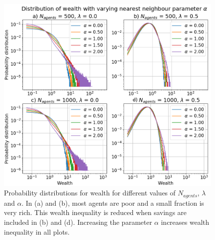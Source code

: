 \documentclass[11pt,a4paper,titlepage]{article}
\begin{document}
\begin{figure}[h!]
\centering
\includegraphics[scale=0.4]{task_d_alpha.png}
\caption{Probability distributions for wealth for different values of $N_{agents}$, $\lambda$ and $\alpha$. In (a) and (b), most agents are poor and a small fraction is very rich. This wealth inequality is reduced when savings are included in (b) and (d). Increasing the parameter $\alpha$ increases wealth inequality in all plots.  \label{fig:task_d_alpha}}
\end{figure}
\end{document}
